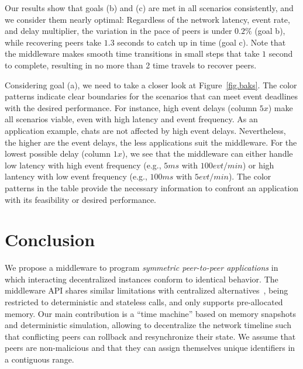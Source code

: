 \documentclass[fleqn,10pt]{SelfArx}
\begin{document}

Our results show that goals (b) and (c) are met in all scenarios consistently,
and we consider them nearly optimal:
Regardless of the network latency, event rate, and delay multiplier,
    the variation in the pace of peers is under $0.2\%$ (goal b), while
    recovering peers take $1.3$ seconds to catch up in time (goal c).
Note that the middleware makes smooth time transitions in small steps that take
$1$ second to complete, resulting in no more than 2 time travels to recover
peers.

Considering goal (a), we need to take a closer look at Figure~\ref{fig.baks}.
The color patterns indicate clear boundaries for the scenarios that can meet
event deadlines with the desired performance.
%
For instance, high event delays (column $5x$) make all scenarios viable,
even with high latency and event frequency.
As an application example, chats are not affected by high event delays.
Nevertheless, the higher are the event delays, the less applications suit the
middleware.
%
For the lowest possible delay (column $1x$), we see that the middleware can
either handle low latency with high event frequency (e.g., $5ms$ with
$100evt/min$) or high lantency with low event frequency (e.g., $100ms$ with
$5evt/min$).
%
The color patterns in the table provide the necessary information to confront
an application with its feasibility or desired performance.


\section{Conclusion}
\label{sec.conclusion}

We propose a middleware to program \emph{symmetric peer-to-peer applications}
in which interacting decentralized instances conform to identical behavior.
%
The middleware API shares similar limitations with centralized
alternatives~\cite{gals,croquet}, being restricted to deterministic and
stateless calls, and only supports pre-allocated memory.
%
Our main contribution is a ``time machine'' based on memory snapshots and
deterministic simulation, allowing to decentralize the network timeline such
that conflicting peers can rollback and resynchronize their state.
%
We assume that peers are non-malicious and that they can assign themselves
unique identifiers in a contiguous range.
\end{document}
